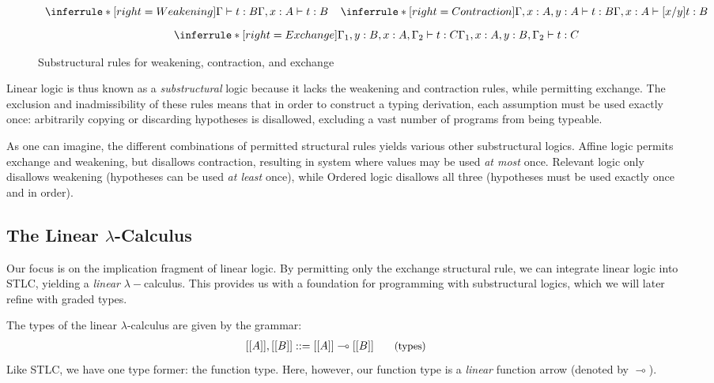\begin{figure}[H]
  \begin{gather*}
  \begin{array}{c}
    \inferrule*[right=Weakening]{\Gamma \vdash t : B}{\Gamma, x : A \vdash t : B}
    \;\;\;\;
    \inferrule*[right=Contraction]{\Gamma, x : A, y : A \vdash t : B}{\Gamma, x : A \vdash [x/y] t : B}
    \\[0.9em]
    \inferrule*[right=Exchange]{\Gamma_{1}, y : B, x : A, \Gamma_{2} \vdash t : C} {\Gamma_{1}, x : A, y : B, \Gamma_{2} \vdash t : C}
    \end{array}
  \end{gather*}
  \caption{Substructural rules for weakening, contraction, and exchange}
  \label{fig:substructural}
\end{figure}

Linear logic is thus known as a \textit{substructural} logic because it lacks
the weakening and contraction rules, while permitting exchange. The exclusion
and inadmissibility of these rules means that in order to construct a typing
derivation, each assumption must be used exactly once: arbitrarily copying or
discarding hypotheses is disallowed, excluding a vast number of programs from being
typeable. 

As one can imagine, the different combinations of permitted structural rules
yields various other substructural logics. Affine logic permits
exchange and weakening, but disallows contraction, resulting in system where
values may be used \emph{at most}  once. Relevant logic only disallows
weakening (hypotheses can be used \emph{at least} once), while Ordered logic disallows all
three (hypotheses must be used exactly once and in order).

\subsection{The Linear $\lambda$-Calculus}
\label{sec:linear-lambda-calc}
Our focus is on the implication fragment of linear logic. By permitting only the
exchange structural rule, we can integrate linear logic into STLC, yielding a
\emph{linear} $\lambda-$calculus. This provides us with a foundation for
programming with substructural logics, which we will later refine with graded
types. 

The types of the linear $\lambda$-calculus are given by the grammar: 
\begin{align*}
  \hspace{-0.9em}[[ A ]] , [[ B ]] & ::=
         [[ A ]] \multimap [[ B ]]
  {\small{\tag{types}}}
\end{align*}
Like STLC, we have one type former: the function type. Here, however, our function type
is a \emph{linear} function arrow (denoted by $\multimap$).

